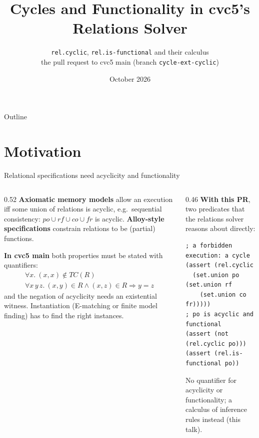 \documentclass[aspectratio=169]{beamer}
\title[Cycles and functionality in cvc5's relations solver]{Cycles and Functionality in cvc5's Relations Solver}
\subtitle{\texttt{rel.cyclic}, \texttt{rel.is-functional} and their calculus\\[1mm]
  \small the pull request to cvc5 main (branch \texttt{cycle-ext-cyclic})}
\author{}
\institute{}
\date{October 2026}
\newcommand{\TC}{\mathit{TC}}
\begin{document}
\frame{\titlepage}

\begin{frame}{Outline}
  \tableofcontents
\end{frame}

\section{Motivation}

\begin{frame}[fragile]{Relational specifications need acyclicity and functionality}
  \begin{columns}[T]
  \begin{column}{0.52\textwidth}
    \small
    \textbf{Axiomatic memory models} allow an execution iff some union of relations is acyclic,
    e.g.\ sequential consistency: $\mathit{po}\cup\mathit{rf}\cup\mathit{co}\cup\mathit{fr}$ is acyclic.
    \textbf{Alloy-style specifications} constrain relations to be (partial) functions.
    \medskip

    \textbf{In cvc5 main} both properties must be stated with quantifiers:
    \[
      \begin{array}{l}
        \forall x.\ (x,x)\notin \TC(R) \\[1mm]
        \forall x\,y\,z.\ (x,y)\in R \wedge (x,z)\in R \Rightarrow y = z
      \end{array}
    \]
    and the negation of acyclicity needs an existential witness. Instantiation (E-matching or
    finite model finding) has to find the right instances.
  \end{column}
  \begin{column}{0.46\textwidth}
    \small
    \textbf{With this PR}, two predicates that the relations solver reasons about directly:
    \begin{block}{}
    \footnotesize
\begin{verbatim}
; a forbidden execution: a cycle
(assert (rel.cyclic
  (set.union po (set.union rf
    (set.union co fr)))))
; po is acyclic and functional
(assert (not (rel.cyclic po)))
(assert (rel.is-functional po))
\end{verbatim}
    \end{block}
    No quantifier for acyclicity or functionality; a calculus of inference rules
    instead (this talk).
  \end{column}
  \end{columns}
\end{frame}
\end{document}
